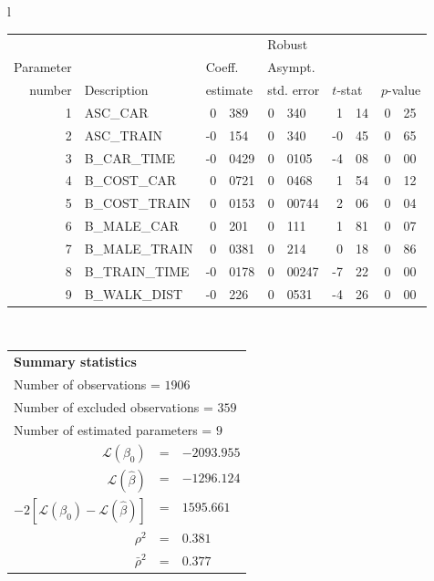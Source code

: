   \begin{tabular}{l}
\begin{tabular}{rlr@{.}lr@{.}lr@{.}lr@{.}l}
         &                       &   \multicolumn{2}{l}{}    & \multicolumn{2}{l}{Robust}  &     \multicolumn{4}{l}{}   \\
Parameter &                       &   \multicolumn{2}{l}{Coeff.}      & \multicolumn{2}{l}{Asympt.}  &     \multicolumn{4}{l}{}   \\
number &  Description                     &   \multicolumn{2}{l}{estimate}      & \multicolumn{2}{l}{std. error}  &   \multicolumn{2}{l}{$t$-stat}  &   \multicolumn{2}{l}{$p$-value}   \\

\hline

1 & ASC_CAR & 0&389 & 0&340 & 1&14 & 0&25\\
2 & ASC_TRAIN & -0&154 & 0&340 & -0&45 & 0&65\\
3 & B_CAR_TIME & -0&0429 & 0&0105 & -4&08 & 0&00\\
4 & B_COST_CAR & 0&0721 & 0&0468 & 1&54 & 0&12\\
5 & B_COST_TRAIN & 0&0153 & 0&00744 & 2&06 & 0&04\\
6 & B_MALE_CAR & 0&201 & 0&111 & 1&81 & 0&07\\
7 & B_MALE_TRAIN & 0&0381 & 0&214 & 0&18 & 0&86\\
8 & B_TRAIN_TIME & -0&0178 & 0&00247 & -7&22 & 0&00\\
9 & B_WALK_DIST & -0&226 & 0&0531 & -4&26 & 0&00\\
\hline
\end{tabular}
\\
\begin{tabular}{rcl}
\multicolumn{3}{l}{\bf Summary statistics}\\
\multicolumn{3}{l}{ Number of observations = $1906$} \\
\multicolumn{3}{l}{ Number of excluded observations = $359$} \\
\multicolumn{3}{l}{ Number of estimated  parameters = $9$} \\
 $\mathcal{L}(\beta_0)$ &=&  $-2093.955$ \\
 $\mathcal{L}(\hat{\beta})$ &=& $-1296.124 $  \\
 $-2[\mathcal{L}(\beta_0) -\mathcal{L}(\hat{\beta})]$ &=& $1595.661$ \\
    $\rho^2$ &=&   $0.381$ \\
    $\bar{\rho}^2$ &=&    $0.377$ \\
\end{tabular}
  \end{tabular}
